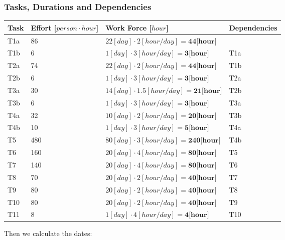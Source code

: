 \subsubsection{Tasks, Durations and Dependencies}
\lipsum[100]
\begin{center}
	\begin{tabulary}{\linewidth\tymin=70pt}{Y{1cm}|Y{2.5cm}|Y{4cm}|Y{2.5cm}}
		\textbf{Task} & \textbf{Effort [$person \cdot hour$]} & \textbf{Work Force [$hour$]} & \textbf{Dependencies} \\ \hline
		T1a &  86 & $22[day] \cdot 2[hour/day] = \textbf{44[hour]}$  & \\ \hline
		T1b & 6 & $1[day] \cdot 3[hour/day] = \textbf{3[hour]}$ & T1a \\ \hline
		T2a & 74 & $22[day] \cdot 2[hour/day] = \textbf{44[hour]}$ & T1b \\ \hline
		T2b & 6 & $1[day] \cdot 3[hour/day] = \textbf{3[hour]}$ & T2a \\ \hline
		T3a & 30 & $14[day] \cdot 1.5[hour/day] = \textbf{21[hour]}$ & T2b \\ \hline
		T3b & 6 & $1[day] \cdot 3[hour/day] = \textbf{3[hour]}$ & T3a \\ \hline
		T4a & 32 & $10[day] \cdot 2[hour/day] = \textbf{20[hour]}$ & T3b \\ \hline
		T4b & 10 & $1[day] \cdot 3[hour/day] = \textbf{5[hour]}$ & T4a \\ \hline
		T5 & 480 & $80[day] \cdot 3[hour/day] = \textbf{240[hour]}$ & T4b \\ \hline
		T6 & 160 & $20[day] \cdot 4[hour/day] = \textbf{80[hour]}$ & T5 \\ \hline
		T7 & 140 & $20[day] \cdot 4[hour/day] = \textbf{80[hour]}$ & T6 \\ \hline
		T8 & 70 & $20[day] \cdot 2[hour/day] = \textbf{40[hour]}$ & T7 \\ \hline
		T9 & 80 & $20[day] \cdot 2[hour/day] = \textbf{40[hour]}$ & T8 \\ \hline
		T10 & 80 & $20[day] \cdot 2[hour/day] = \textbf{40[hour]}$ & T9 \\ \hline
		T11 & 8 & $1[day] \cdot 4[hour/day] = \textbf{4[hour]}$ & T10 \\
	\end{tabulary}
\end{center}
Then we calculate the dates:
